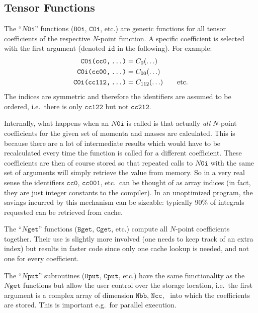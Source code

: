 \documentclass[twoside,12pt]{report}
\let\dots\textellipsis
\def\ie{i.e.\ }
\def\eg{e.g.\ }
\def\Code#1{\ensuremath{\texttt{#1}}}
\begin{document}
\subsection{Tensor Functions}
%
%

The ``\Code{$N$0i}'' functions (\Code{B0i}, \Code{C0i}, etc.) are generic
functions for all tensor coefficients of the respective $N$-point 
function.  A specific coefficient is selected with the first argument
(denoted \Code{id} in the following).  For example:
$$
\begin{aligned}
\text{\Code{C0i(cc0,\,\dots)}} &= C_0(\ldots) \\
\text{\Code{C0i(cc00,\,\dots)}} &= C_{00}(\ldots) \\
\text{\Code{C0i(cc112,\,\dots)}} &= C_{112}(\ldots) \qquad \text{etc.}
\end{aligned}
$$
The indices are symmetric and therefore the identifiers are assumed to be
ordered, \ie there is only \Code{cc122} but not \Code{cc212}.

%
Internally, what happens when an \Code{$N$0i} is called is that actually
\textit{all} $N$-point coefficients for the given set of momenta and
masses are calculated.  This is because there are a lot of intermediate
results which would have to be recalculated every time the function is 
called for a different coefficient.  These coefficients are then of course 
stored so that repeated calls to \Code{$N$0i} with the same set of 
arguments will simply retrieve the value from memory.  So in a very real 
sense the identifiers \Code{cc0}, \Code{cc001}, etc.\ can be thought of 
as array indices (in fact, they are just integer constants to the compiler).  
In an unoptimized program, the savings incurred by this mechanism can be 
sizeable: typically 90\% of integrals requested can be retrieved from cache.

The ``\Code{$N$get}'' functions (\Code{Bget}, \Code{Cget}, etc.) compute
all $N$-point coefficients together.  Their use is slightly more involved
(one needs to keep track of an extra index) but results in faster code 
since only one cache lookup is needed, and not one for every coefficient.

The ``\Code{$N$put}'' subroutines (\Code{Bput}, \Code{Cput}, etc.) have
the same functionality as the \Code{$N$get} functions but allow the user
control over the storage location, \ie the first argument is a complex
array of dimension \Code{Nbb}, \Code{Ncc}, \dots\ into which the 
coefficients are stored.  This is important \eg for parallel execution.
\end{document}
